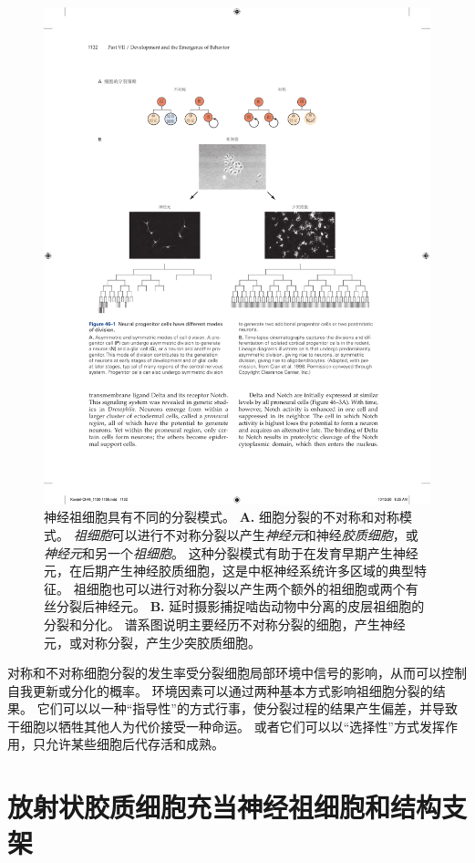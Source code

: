 \begin{figure}[htbp]
	\centering
	\includegraphics[width=0.9\linewidth]{chap46/fig_46_1}
	\caption{神经祖细胞具有不同的分裂模式。
		\textbf{A.} 细胞分裂的不对称和对称模式。
		\textit{祖细胞}可以进行不对称分裂以产生\textit{神经元}和神经\textit{胶质细胞}，或\textit{神经元}和另一个\textit{祖细胞}。
		这种分裂模式有助于在发育早期产生神经元，在后期产生神经胶质细胞，这是中枢神经系统许多区域的典型特征。
		祖细胞也可以进行对称分裂以产生两个额外的祖细胞或两个有丝分裂后神经元。
		\textbf{B.} 延时摄影捕捉啮齿动物中分离的皮层祖细胞的分裂和分化。
		谱系图说明主要经历不对称分裂的细胞，产生神经元，或对称分裂，产生少突胶质细胞\cite{qian1998intrinsic}。}
	\label{fig:46_1}
\end{figure}


对称和不对称细胞分裂的发生率受分裂细胞局部环境中信号的影响，从而可以控制自我更新或分化的概率。
环境因素可以通过两种基本方式影响祖细胞分裂的结果。 它们可以以一种“指导性”的方式行事，使分裂过程的结果产生偏差，并导致干细胞以牺牲其他人为代价接受一种命运。
或者它们可以以“选择性”方式发挥作用，只允许某些细胞后代存活和成熟。



\section{放射状胶质细胞充当神经祖细胞和结构支架}

